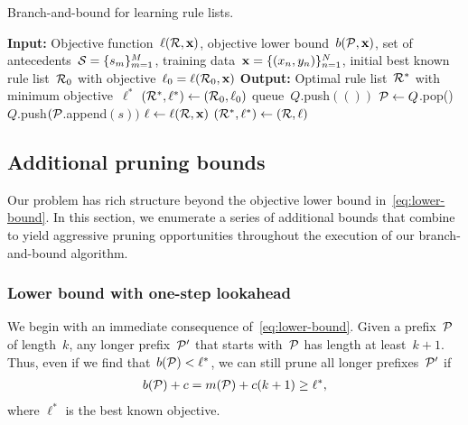 \begin{algorithm}[t!]
\caption{Branch-and-bound for learning rule lists.}
\label{alg:branch-and-bound}
\begin{algorithmic}
\normalsize
\State \textbf{Input:} Objective function~$\ell({\mathcal R}, \mathbf{x})$, objective lower bound~${b({\mathcal P}, \mathbf{x})}$,
set of antecedents~${{\mathcal S} = \{s_m\}_{m=1}^M}$, training data~$\mathbf{x} = {\{(x_n, y_n)\}_{n=1}^N}$,
initial best known rule list~${\mathcal R}_0$ with objective~${\ell_0 = \ell({\mathcal R}_0, \mathbf{x})}$
\State \textbf{Output:} Optimal rule list~${\mathcal R}^*$ with minimum objective~$\ell^*$
\State $({\mathcal R}^*, \ell^*) \gets ({\mathcal R}_0, \ell_0)$ 
\State queue~$Q$.push$(())$ 
 
	\State ${\mathcal P} \gets Q$.pop() 
	 
         
            \State $Q$.push$({\mathcal P}$.append$(s))$ 
        \EndFor
        \State $\ell \gets \ell({\mathcal R}, \mathbf{x})$ 
        \If {$\ell < \ell^*$}
            \State $({\mathcal R}^*, \ell^*) \gets ({\mathcal R}, \ell)$ 
        \EndIf
    \EndIf
\EndWhile
\end{algorithmic}
\end{algorithm}

\subsection{Additional pruning bounds}

Our problem has rich structure beyond the objective lower bound in~\eqref{eq:lower-bound}.
%
In this section, we enumerate a series of additional bounds that combine to yield
aggressive pruning opportunities throughout the execution of our branch-and-bound algorithm.

\subsubsection{Lower bound with one-step lookahead}

We begin with an immediate consequence of~\eqref{eq:lower-bound}.
%
Given a prefix~${\mathcal P}$ of length~$k$, any longer prefix~${\mathcal P}'$ that starts
with~${\mathcal P}$ has length at least~${k+1}$.
%
Thus, even if we find that~${b({\mathcal P}) < \ell^*}$, we can still prune all longer
prefixes~${\mathcal P}'$ if
\begin{align}
b(\Prefix) + c = m(\Prefix) + c (k + 1) \ge \ell^*,
\end{align}
where $\ell^*$ is the best known objective.

